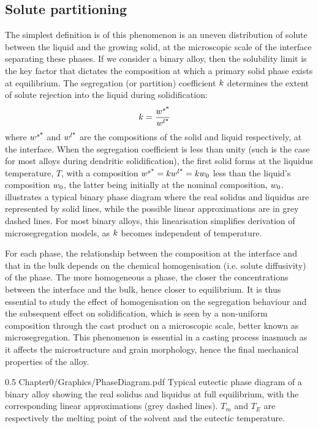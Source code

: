 \subsection{Solute partitioning}
The simplest definition is of this phenomenon is an uneven distribution of solute between the liquid and the growing solid, at the microscopic scale
of the interface separating these phases. If we consider a binary alloy, then the solubility limit is 
the key factor that dictates the composition at which a primary solid phase exists at equilibrium. 
The segregation (or partition) coefficient $k$ determines the extent of solute rejection into the liquid during solidification:
\begin{align}
\label{eq:partition}
& k = \frac{{w}^{s \text{*}} }{{w}^{l \text{*}} }
\end{align}
where ${w}^{s \text{*}} $ and ${w}^{l \text{*}} $ are the compositions of the solid and liquid respectively, at the interface. When the 
segregation coefficient is less than unity (such is the case for most alloys during dendritic solidification), 
the first solid forms at the liquidus temperature, $T$, with a composition ${w}^{s \text{*}} =k {w}^{l \text{*}} =k {w}_0$ less than the liquid's 
composition ${w}_0$, the latter being initially at the nominal composition, ${w}_0$.  illustrates a typical binary 
phase diagram where the real solidus and liquidus are represented by solid lines, while the possible linear approximations are in grey dashed lines.
For most binary alloys, this linearisation simplifies derivation of microsegregation models, as $k$ becomes independent of temperature.

For each phase, the relationship between the composition at the interface and that in the bulk depends on the chemical homogenisation (i.e. solute diffusivity) of the phase.
The more homogeneous a phase, the closer the concentrations between the interface and the bulk, hence closer to equilibrium.
It is thus essential to study the effect of homogenisation on the segregation behaviour and the subsequent effect on solidification, 
which is seen by a non-uniform composition through the cast product on a microscopic scale, better known as microsegregation.
This phenomenon is essential in a casting process inasmuch as it affects the microstructure and grain morphology, hence the final
mechanical properties of the alloy.
\begin{figureth}
{0.5}
{Chapter0/Graphics/PhaseDiagram.pdf}
{Typical eutectic phase diagram of a binary alloy showing the real solidus and liquidus at full equilibrium,
with the corresponding linear approximations (grey dashed lines). $T_m$ and $T_E$ are respectively the melting point
of the solvent and the eutectic temperature.}
\label{fig:binary_diag}
\end{figureth}
%

